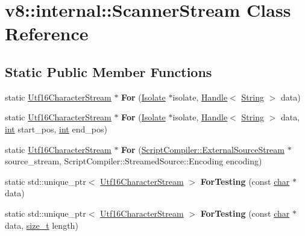 \hypertarget{classv8_1_1internal_1_1ScannerStream}{}\section{v8\+:\+:internal\+:\+:Scanner\+Stream Class Reference}
\label{classv8_1_1internal_1_1ScannerStream}
\subsection*{Static Public Member Functions}
\begin{DoxyCompactItemize}
\item 
\mbox{\label{classv8_1_1internal_1_1ScannerStream_a47f18844257083025ed33a47f3ac55ae}} 
static \mbox{\hyperlink{classv8_1_1internal_1_1Utf16CharacterStream}{Utf16\+Character\+Stream}} $\ast$ {\bfseries For} (\mbox{\hyperlink{classv8_1_1internal_1_1Isolate}{Isolate}} $\ast$isolate, \mbox{\hyperlink{classv8_1_1internal_1_1Handle}{Handle}}$<$ \mbox{\hyperlink{classv8_1_1internal_1_1String}{String}} $>$ data)
\item 
\mbox{\label{classv8_1_1internal_1_1ScannerStream_a3de303a591a69fadc5d01a5787984e85}} 
static \mbox{\hyperlink{classv8_1_1internal_1_1Utf16CharacterStream}{Utf16\+Character\+Stream}} $\ast$ {\bfseries For} (\mbox{\hyperlink{classv8_1_1internal_1_1Isolate}{Isolate}} $\ast$isolate, \mbox{\hyperlink{classv8_1_1internal_1_1Handle}{Handle}}$<$ \mbox{\hyperlink{classv8_1_1internal_1_1String}{String}} $>$ data, \mbox{\hyperlink{classint}{int}} start\+\_\+pos, \mbox{\hyperlink{classint}{int}} end\+\_\+pos)
\item 
\mbox{\label{classv8_1_1internal_1_1ScannerStream_a2f6051f8de0ae5ee7a837e88c92c8394}} 
static \mbox{\hyperlink{classv8_1_1internal_1_1Utf16CharacterStream}{Utf16\+Character\+Stream}} $\ast$ {\bfseries For} (\mbox{\hyperlink{classv8_1_1ScriptCompiler_1_1ExternalSourceStream}{Script\+Compiler\+::\+External\+Source\+Stream}} $\ast$source\+\_\+stream, Script\+Compiler\+::\+Streamed\+Source\+::\+Encoding encoding)
\item 
\mbox{\label{classv8_1_1internal_1_1ScannerStream_ae1dedf90efa28d18bcc0aa838b6689c0}} 
static std\+::unique\+\_\+ptr$<$ \mbox{\hyperlink{classv8_1_1internal_1_1Utf16CharacterStream}{Utf16\+Character\+Stream}} $>$ {\bfseries For\+Testing} (const \mbox{\hyperlink{classchar}{char}} $\ast$data)
\item 
\mbox{\label{classv8_1_1internal_1_1ScannerStream_a19271ef1a136501272e1abbfcd0f77fb}} 
static std\+::unique\+\_\+ptr$<$ \mbox{\hyperlink{classv8_1_1internal_1_1Utf16CharacterStream}{Utf16\+Character\+Stream}} $>$ {\bfseries For\+Testing} (const \mbox{\hyperlink{classchar}{char}} $\ast$data, \mbox{\hyperlink{classsize__t}{size\+\_\+t}} length)
\end{DoxyCompactItemize}


